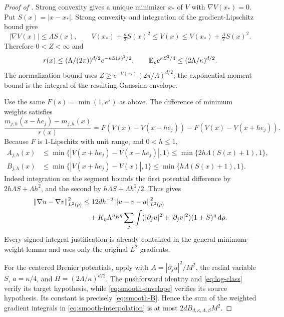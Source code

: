 \documentclass[11pt]{article}
\numberwithin{equation}{section}
\theoremstyle{remark}\newtheorem{remark}[theorem]{Remark}
\begin{document}
\begin{proof}[Proof of ]
Strong convexity gives a unique minimizer $x_*$ of $V$ with $\nabla V(x_*)=0$. Put $S(x)=|x-x_*|$. Strong convexity and integration of the gradient-Lipschitz bound give
\[
 |\nabla V(x)|\le\Lambda S(x),\qquad
 V(x_*)+\tfrac\kappa2 S(x)^2\le V(x)
 \le V(x_*)+\tfrac\Lambda2 S(x)^2.
\]
Therefore $0<Z<\infty$ and
\begin{equation}\label{eq:smooth-envelope}
 r(x)\le(\Lambda/(2\pi))^{d/2}e^{-\kappa S(x)^2/2},
 \qquad \mathbb E_\rho e^{\kappa S^2/4}\le(2\Lambda/\kappa)^{d/2}.
\end{equation}
The normalization bound uses $Z\ge e^{-V(x_*)}(2\pi/\Lambda)^{d/2}$; the exponential-moment bound is the integral of the resulting Gaussian envelope.

Use the same $F(s)=\min(1,e^s)$ as above. The difference of minimum weights satisfies
\[
 \frac{m_{j,h}(x-he_j)-m_{j,h}(x)}{r(x)}
 =F(V(x)-V(x-he_j))-F(V(x)-V(x+he_j)).
\]
Because $F$ is $1$-Lipschitz with unit range, and $0<h\le1$,
\begin{align*}
 A_{j,h}(x)&\le\min\{|V(x+he_j)-V(x-he_j)|,1\}
 \le\min\{2h\Lambda(S(x)+1),1\},\\
 B_{j,h}(x)&\le\min\{|V(x+he_j)-V(x)|,1\}
 \le\min\{h\Lambda(S(x)+1),1\}.
\end{align*}
Indeed integration on the segment bounds the first potential difference by $2h\Lambda S+\Lambda h^2$, and the second by $h\Lambda S+\Lambda h^2/2$. Thus  gives
\begin{equation}\label{eq:smooth-interpolation}
 \begin{split}
 \left\lVert\nabla u-\nabla v\right\rVert_{L^2(\rho)}^2
 &\le12dh^{-2}\left\lVert u-v-a\right\rVert_{L^2(\rho)}^2\\
 &\quad+K_\eta\Lambda^\eta h^\eta\sum_j\int
 (|\partial_j u|^2+|\partial_j v|^2)(1+S)^\eta\,\mathrm d\rho.
 \end{split}
\end{equation}
Every signed-integral justification is already contained in the general minimum-weight lemma and uses only the original $L^2$ gradients.

For the centered Brenier potentials, apply  with $A=|\partial_j u|^2/M^2$, the radial variable $S$, $a=\kappa/4$, and $H=(2\Lambda/\kappa)^{d/2}$. The pushforward identity and \eqref{eq:log-class} verify its target hypothesis, while \eqref{eq:smooth-envelope} verifies its source hypothesis. Its constant is precisely \eqref{eq:smooth-B}. Hence the sum of the weighted gradient integrals in \eqref{eq:smooth-interpolation} is at most $2dB_{d,\kappa,\Lambda,\beta}M^2$.


\end{proof}
\end{document}
